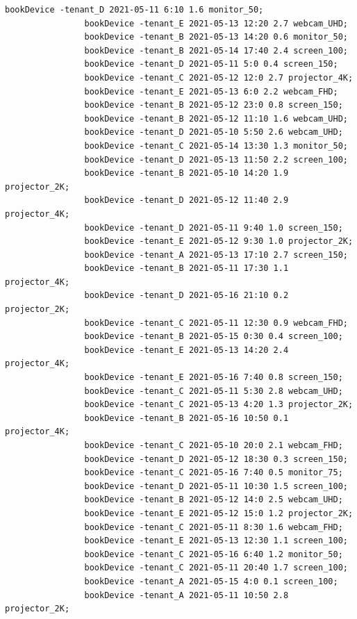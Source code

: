 \documentclass{article}
\begin{document}
\begin{Verbatim}[gobble=8]
                bookDevice -tenant_D 2021-05-11 6:10 1.6 monitor_50;
                bookDevice -tenant_E 2021-05-13 12:20 2.7 webcam_UHD;
                bookDevice -tenant_B 2021-05-13 14:20 0.6 monitor_50;
                bookDevice -tenant_B 2021-05-14 17:40 2.4 screen_100;
                bookDevice -tenant_D 2021-05-11 5:0 0.4 screen_150;
                bookDevice -tenant_C 2021-05-12 12:0 2.7 projector_4K;
                bookDevice -tenant_E 2021-05-13 6:0 2.2 webcam_FHD;
                bookDevice -tenant_B 2021-05-12 23:0 0.8 screen_150;
                bookDevice -tenant_B 2021-05-12 11:10 1.6 webcam_UHD;
                bookDevice -tenant_D 2021-05-10 5:50 2.6 webcam_UHD;
                bookDevice -tenant_C 2021-05-14 13:30 1.3 monitor_50;
                bookDevice -tenant_D 2021-05-13 11:50 2.2 screen_100;
                bookDevice -tenant_B 2021-05-10 14:20 1.9 projector_2K;
                bookDevice -tenant_D 2021-05-12 11:40 2.9 projector_4K;
                bookDevice -tenant_D 2021-05-11 9:40 1.0 screen_150;
                bookDevice -tenant_E 2021-05-12 9:30 1.0 projector_2K;
                bookDevice -tenant_A 2021-05-13 17:10 2.7 screen_150;
                bookDevice -tenant_B 2021-05-11 17:30 1.1 projector_4K;
                bookDevice -tenant_D 2021-05-16 21:10 0.2 projector_2K;
                bookDevice -tenant_C 2021-05-11 12:30 0.9 webcam_FHD;
                bookDevice -tenant_B 2021-05-15 0:30 0.4 screen_100;
                bookDevice -tenant_E 2021-05-13 14:20 2.4 projector_4K;
                bookDevice -tenant_E 2021-05-16 7:40 0.8 screen_150;
                bookDevice -tenant_C 2021-05-11 5:30 2.8 webcam_UHD;
                bookDevice -tenant_C 2021-05-13 4:20 1.3 projector_2K;
                bookDevice -tenant_B 2021-05-16 10:50 0.1 projector_4K;
                bookDevice -tenant_C 2021-05-10 20:0 2.1 webcam_FHD;
                bookDevice -tenant_D 2021-05-12 18:30 0.3 screen_150;
                bookDevice -tenant_C 2021-05-16 7:40 0.5 monitor_75;
                bookDevice -tenant_D 2021-05-11 10:30 1.5 screen_100;
                bookDevice -tenant_B 2021-05-12 14:0 2.5 webcam_UHD;
                bookDevice -tenant_E 2021-05-12 15:0 1.2 projector_2K;
                bookDevice -tenant_C 2021-05-11 8:30 1.6 webcam_FHD;
                bookDevice -tenant_E 2021-05-13 12:30 1.1 screen_100;
                bookDevice -tenant_C 2021-05-16 6:40 1.2 monitor_50;
                bookDevice -tenant_C 2021-05-11 20:40 1.7 screen_100;
                bookDevice -tenant_A 2021-05-15 4:0 0.1 screen_100;
                bookDevice -tenant_A 2021-05-11 10:50 2.8 projector_2K;

\end{Verbatim}
\end{document}
